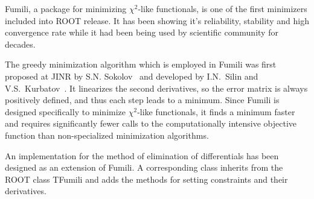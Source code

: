 
Fumili, a package for minimizing $\chi^2$-like functionals, is one of the first minimizers included into ROOT release.
It has been showing it's reliability, stability and high convergence rate while it had been being used by scientific community for decades.

The greedy minimization algorithm which is employed in Fumili was first proposed at JINR by S.N. Sokolov~\cite{fum_1st} and developed by I.N.~Silin and V.S.~Kurbatov~\cite{fum_prog}.
It linearizes the second derivatives, so the error matrix is always positively defined, and thus each step leads to a minimum.
Since Fumili is designed specifically to minimize $\chi^2$-like functionals, it finds a minimum faster and requires significantly fewer calls to the computationally intensive objective function than non-specialized minimization algorithms.

An implementation for the method of elimination of differentials has been designed as an extension of Fumili.
A corresponding class inherits from the ROOT class TFumili and adds the methods for setting constraints and their derivatives.



%

